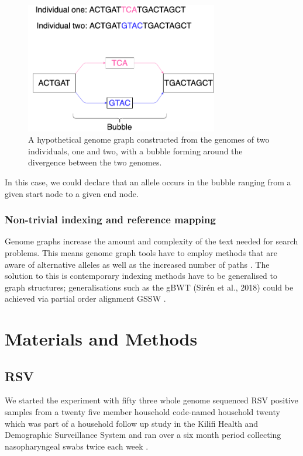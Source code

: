 \documentclass[10pt, a4paper]{article}
\begin{document}
\begin{figure}[h]
\centering
\includegraphics[width=0.75\textwidth]{../Figures/bubble.png}
\caption[A bubble in a graph]{\label{fig:orgefc6fda}A hypothetical genome graph constructed from the genomes of two individuals, one and two, with a bubble forming around the divergence between the two genomes.}
\end{figure}

In this case, we could declare that an allele occurs in the bubble ranging from
a given start node to a given end node.

\subsubsection{Non-trivial indexing and reference mapping}
\label{sec:org77eaedd}
Genome graphs increase the amount and complexity of the text needed for search
problems. 
This means genome graph tools have to employ methods that are aware of 
alternative alleles as well as the increased number of paths 
\cite{patenGenomeGraphsEvolution2017}. 
The solution to this is contemporary indexing methods have to be generalised to 
graph structures; generalisations such as the gBWT (Sirén et al., 2018) could
 be achieved via partial order alignment GSSW \cite{zhaoSSWLibrarySIMD2013}.

\newpage
\section{Materials and Methods}
\label{sec:orgb4f65dc}
\subsection{RSV}
\label{sec:org5d8d3b8}
We started the experiment with fifty three whole genome sequenced RSV 
positive samples from a twenty five member household code-named household twenty
which was part of a household follow up study in the Kilifi Health and 
Demographic Surveillance System and ran over a six month
period collecting nasopharyngeal swabs twice each week
\cite{munywokiInfluenceAgeSeverity2015,agotiTransmissionPatternsEvolution2017,githinjiAssessingUtilityMinority2018}.
\end{document}
